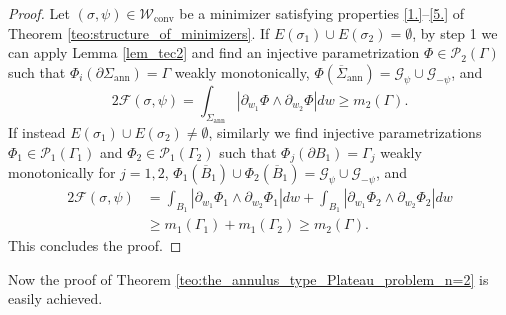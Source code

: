 \documentclass[JEP,XML,SOM,Unicode, NoFloatCountersInSection,published]{cedram}
\newcommand\admclassconv{{\mathcal W_\mathrm{conv}}}
\newcommand{\openannulus}{\Sigma_\mathrm{ann}}
\theoremstyle{definition}
\begin{document}
\begin{proof}
Let $(\sigma,\psi)\in\admclassconv$ be a minimizer satisfying
properties
\ref{1.}--\ref{5.} of
Theorem \ref{teo:structure_of_minimizers}.
If $E(\sigma_1)\cup E(\sigma_2)=\emptyset$, by step 1 we can apply Lemma \ref{lem_tec2} and find an injective parametrization
$\Phi\in \mathcal P_2(\Gamma)$ such that
$\Phi_i(\partial \openannulus)=\Gamma$ weakly monotonically,
$\Phi(\overline\Sigma_\mathrm{ann})=\mathcal G_\psi\cup \mathcal G_{-\psi}$, and
\[
2\mathcal{F}(\sigma,\psi)=\int_{\Sigma_\mathrm{ann}}|\partial_{w_1}\Phi\wedge\partial_{w_2}\Phi|dw\geq m_2(\Gamma).
\]
If instead $E(\sigma_1)\cup E(\sigma_2)\ne\emptyset$, similarly we find injective parametrizations
$\Phi_1\in \mathcal P_1(\Gamma_1)$ and $\Phi_2\in \mathcal P_1(\Gamma_2) $
such that $\Phi_j(\partial B_1)=\Gamma_j$ weakly monotonically
for $j=1,2$, $\Phi_1(\overline B_1)\cup\Phi_2(\overline B_1)=\mathcal G_\psi\cup \mathcal G_{-\psi}$, and
\begin{align*}
2\mathcal{F}(\sigma,\psi)&=\int_{B_{1}}|\partial_{w_1}\Phi_1\wedge\partial_{w_2}\Phi_1|dw+\int_{B_{1}}|\partial_{w_1}\Phi_2\wedge\partial_{w_2}\Phi_2|dw\\&\geq m_1(\Gamma_1)+ m_1(\Gamma_2)\ge m_2(\Gamma).
\end{align*}
This concludes the proof.
\end{proof}

Now the proof of Theorem \ref{teo:the_annulus_type_Plateau_problem_n=2} is easily achieved.
\end{document}
